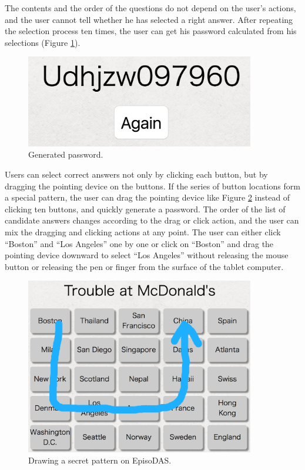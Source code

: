 \documentclass[sigconf]{acmart}
\begin{document}
The contents and the order of the questions
do not depend on the user's actions, and
the user cannot tell whether he has selected a right answer.
%
After repeating the selection process ten times,
the user can get his password
calculated from his selections (Figure \ref{Result}).

\begin{figure}
  \includegraphics[width=10cm,bb=0 0 1160 468]{figures/result.png}
  \caption{Generated password.}
  \label{Result}
\end{figure}

Users can select correct answers not only by clicking each button,
but by dragging the pointing device on the buttons.
%
If the series of button locations form a special pattern,
the user can drag the pointing device like
Figure \ref{draw} instead of clicking ten buttons,
and quickly generate a password.
%
The order of the list of candidate answers changes according to the
drag or click action,
and the user can mix the dragging and clicking actions at any point.
The user can either click ``Boston'' and ``Los Angeles'' one by one or
click on ``Boston'' and drag the pointing device downward to select
``Los Angeles'' without releasing the mouse button or releasing the
pen or finger from the surface of the tablet computer.

\begin{figure}[H]
  \includegraphics[width=10cm,bb=-60 0 1296 1046]{figures/draw.png}
  \caption{Drawing a secret pattern on EpisoDAS.}
  \label{draw}
\end{figure}
\end{document}
